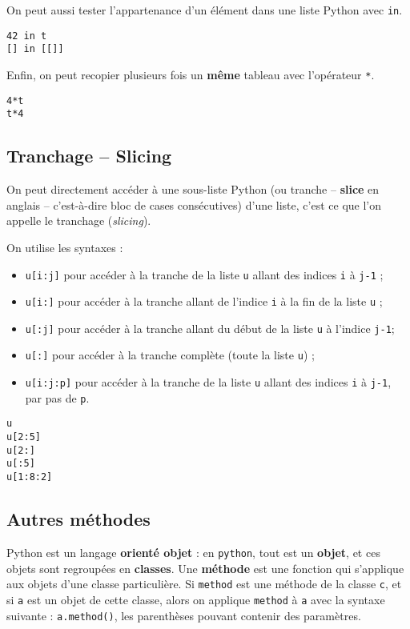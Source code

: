 On peut aussi tester l'appartenance d'un élément dans une liste Python avec \texttt{in}.

\begin{lstlisting}
42 in t
[] in [[]]
\end{lstlisting}

Enfin, on peut recopier plusieurs fois un \textbf{même} tableau avec l'opérateur \texttt{*}.

\begin{lstlisting}
4*t
t*4
\end{lstlisting}






%
\subsection{Tranchage -- Slicing}

On peut directement accéder à une sous-liste Python (ou tranche -- \textbf{slice} en anglais -- 
c'est-à-dire bloc de cases consécutives) d'une liste, c'est ce que l'on appelle le tranchage 
(\textit{slicing}).

On utilise les  syntaxes :
\begin{itemize}
  \item \texttt{u[i:j]} pour accéder à la tranche de la liste \texttt{u} allant des indices \texttt{i} à \texttt{j-1} ;
  \item \texttt{u[i:]} pour accéder à la tranche allant de l'indice \texttt{i} à la fin de la liste \texttt{u} ;
  \item \texttt{u[:j]} pour accéder à la tranche allant du début de la liste \texttt{u} à l'indice \texttt{j-1};
  \item \texttt{u[:]} pour accéder à la tranche complète (toute la liste \texttt{u}) ;
  \item \texttt{u[i:j:p]} pour accéder à la tranche de la liste \texttt{u} allant des indices \texttt{i} à \texttt{j-1}, par pas de \texttt{p}.
\end{itemize}

\begin{lstlisting}
u
u[2:5]
u[2:]
u[:5]
u[1:8:2]
\end{lstlisting}

\subsection{Autres méthodes}
Python est un langage \textbf{orienté objet} : en \texttt{python}, tout est un \textbf{objet}, et ces objets 
sont regroupées en \textbf{classes}. Une \textbf{méthode} est une fonction qui s'applique aux objets 
d'une classe particulière. Si \texttt{method} est une méthode de la classe \texttt{c}, et si 
\texttt{a} est un objet de cette classe, alors on applique \texttt{method} à \texttt{a} avec la 
syntaxe suivante : \texttt{a.method()}, les parenthèses pouvant contenir des paramètres.\\

